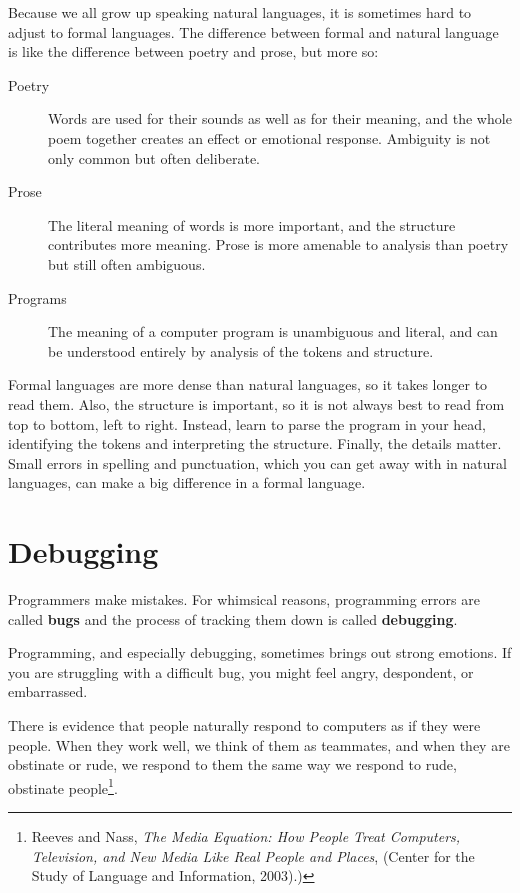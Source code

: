 Because we all grow up speaking natural languages, it is sometimes
hard to adjust to formal languages.  The difference between formal and
natural language is like the difference between poetry and prose, but
more so:  

\begin{description}

\item[Poetry] Words are used for their sounds as well as for
their meaning, and the whole poem together creates an effect or
emotional response.  Ambiguity is not only common but often
deliberate.

\item[Prose] The literal meaning of words is more important,
and the structure contributes more meaning.  Prose is more amenable to
analysis than poetry but still often ambiguous.

\item[Programs] The meaning of a computer program is unambiguous
and literal, and can be understood entirely by analysis of the
tokens and structure.

\end{description}

Formal languages are more dense
than natural languages, so it takes longer to read them.  Also, the
structure is important, so it is not always best to read
from top to bottom, left to right.  Instead, learn to parse the
program in your head, identifying the tokens and interpreting the
structure.  Finally, the details matter.  Small errors in
spelling and punctuation, which you can get away
with in natural languages, can make a big difference in a formal
language.


\section{Debugging}

Programmers make mistakes.  For whimsical reasons, programming errors
are called {\bf bugs} and the process of tracking them down is called
{\bf debugging}.

Programming, and especially debugging, sometimes brings out strong
emotions.  If you are struggling with a difficult bug, you might 
feel angry, despondent, or embarrassed.

There is evidence that people naturally respond to computers as if
they were people.  When they work well, we think
of them as teammates, and when they are obstinate or rude, we
respond to them the same way we respond to rude,
obstinate people\footnote{Reeves and Nass, {\it The Media
    Equation: How People Treat Computers, Television, and New Media
    Like Real People and Places}, (Center for the Study of Language and Information, 2003).)}.

